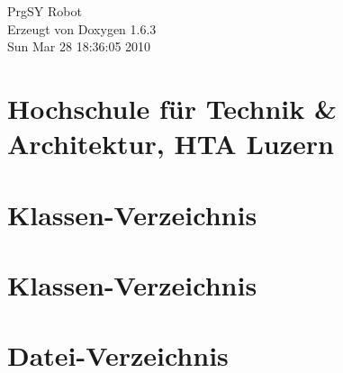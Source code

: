 \documentclass[a4paper]{book}
\begin{document}
\hypersetup{pageanchor=false}
\begin{titlepage}
\vspace*{7cm}
\begin{center}
{\Large PrgSY Robot }\\
\vspace*{1cm}
{\large Erzeugt von Doxygen 1.6.3}\\
\vspace*{0.5cm}
{\small Sun Mar 28 18:36:05 2010}\\
\end{center}
\end{titlepage}
\clearemptydoublepage
{}
\tableofcontents
\clearemptydoublepage
{}
\hypersetup{pageanchor=true}
\chapter{Hochschule f\"{u}r Technik \& Architektur, HTA Luzern}
\label{index}\hypertarget{index}{}
\chapter{Klassen-\/Verzeichnis}

\chapter{Klassen-\/Verzeichnis}

\chapter{Datei-\/Verzeichnis}

\end{document}
